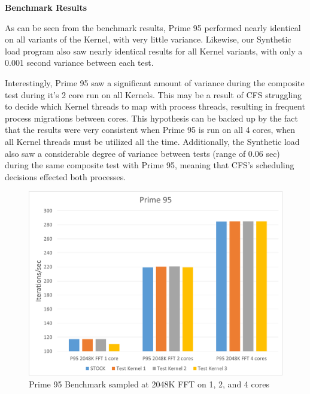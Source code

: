 \vspace{1pc}
\noindent\textbf{Benchmark Results}
\vspace{1pc}

As can be seen from the benchmark results, Prime 95 performed nearly identical on all variants of the Kernel, with very little variance. Likewise, our Synthetic load program also saw nearly identical results for all Kernel variants, with only a 0.001 second variance between each test.

Interestingly, Prime 95 saw a significant amount of variance during the composite test during it's 2 core run on all Kernels. This may be a result of CFS struggling to decide which Kernel threads to map with process threads, resulting in frequent process migrations between cores. This hypothesis can be backed up by the fact that the results were very consistent when Prime 95 is run on all 4 cores, when all Kernel threads must be utilized all the time. Additionally, the Synthetic load also saw a considerable degree of variance between tests (range of 0.06 sec) during the same composite test with Prime 95, meaning that CFS's scheduling decisions effected both processes.

\begin{figure}[hb]
	\includegraphics[width=1.0\columnwidth]{images/P95}
	\caption{Prime 95 Benchmark sampled at 2048K FFT on 1, 2, and 4 cores}
\end{figure}

